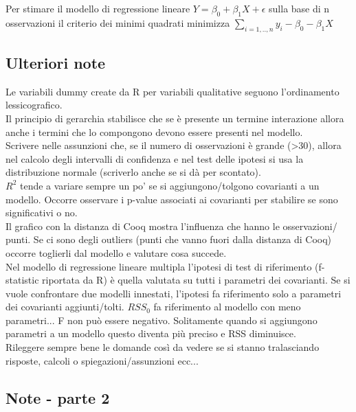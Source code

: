 Per stimare il modello di regressione lineare $Y = \beta_0 + \beta_1X + \epsilon$ sulla
base di n osservazioni il criterio dei minimi quadrati minimizza
$\sum_{i=1,..,n} y_i - \beta_0 - \beta_1X$

\subsection{Ulteriori note}

Le variabili dummy create da R per variabili qualitative seguono
l'ordinamento lessicografico.\\

Il principio di gerarchia stabilisce che se è presente un termine
interazione allora anche i termini che lo compongono devono essere presenti
nel modello.\\

Scrivere nelle assunzioni che, se il numero di osservazioni è grande (>30),
allora nel calcolo degli intervalli di confidenza e nel test delle ipotesi
si usa la distribuzione normale (scriverlo anche se si dà per scontato).\\

$R^2$ tende a variare sempre un po' se si aggiungono/tolgono covarianti a un
modello. Occorre osservare i p-value associati ai covarianti per stabilire se
sono significativi o no.\\

Il grafico con la distanza di Cooq mostra l'influenza che hanno le osservazioni/
punti. Se ci sono degli outliers (punti che vanno fuori dalla distanza di Cooq)
occorre toglierli dal modello e valutare cosa succede.\\

Nel modello di regressione lineare multipla l'ipotesi di test di riferimento
(f-statistic riportata da R) è quella valutata su tutti i parametri dei
covarianti. Se si vuole confrontare due modelli innestati, l'ipotesi fa riferimento
solo a parametri dei covarianti aggiunti/tolti. $RSS_0$ fa riferimento al modello
con meno parametri... F non può essere negativo. Solitamente quando si aggiungono
parametri a un modello questo diventa più preciso e RSS diminuisce.\\

Rileggere sempre bene le domande così da vedere se si stanno tralasciando 
risposte, calcoli o spiegazioni/assunzioni ecc...

\subsection{Note - parte 2}

